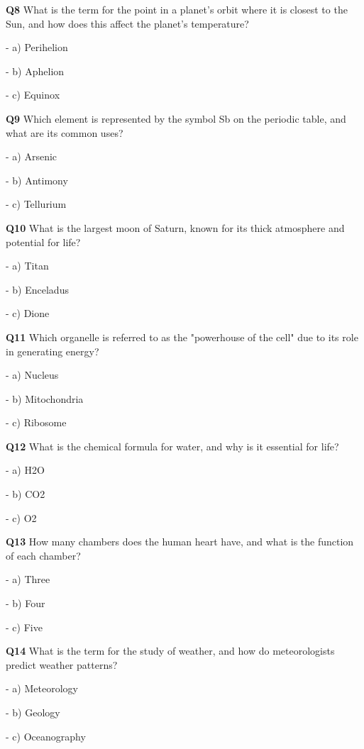 \textbf{Q8} What is the term for the point in a planet's orbit where it is closest to the Sun, and how does this affect the planet's temperature?\par
\quad - a) Perihelion\par
\quad - b) Aphelion\par
\quad - c) Equinox\par

\textbf{Q9} Which element is represented by the symbol Sb on the periodic table, and what are its common uses?\par
\quad - a) Arsenic\par
\quad - b) Antimony\par
\quad - c) Tellurium\par

\textbf{Q10} What is the largest moon of Saturn, known for its thick atmosphere and potential for life?\par
\quad - a) Titan\par
\quad - b) Enceladus\par
\quad - c) Dione\par

\textbf{Q11} Which organelle is referred to as the "powerhouse of the cell" due to its role in generating energy?\par
\quad - a) Nucleus\par
\quad - b) Mitochondria\par
\quad - c) Ribosome\par

\textbf{Q12} What is the chemical formula for water, and why is it essential for life?\par
\quad - a) H2O\par
\quad - b) CO2\par
\quad - c) O2\par

\textbf{Q13} How many chambers does the human heart have, and what is the function of each chamber?\par
\quad - a) Three\par
\quad - b) Four\par
\quad - c) Five\par

\textbf{Q14} What is the term for the study of weather, and how do meteorologists predict weather patterns?\par
\quad - a) Meteorology\par
\quad - b) Geology\par
\quad - c) Oceanography\par

